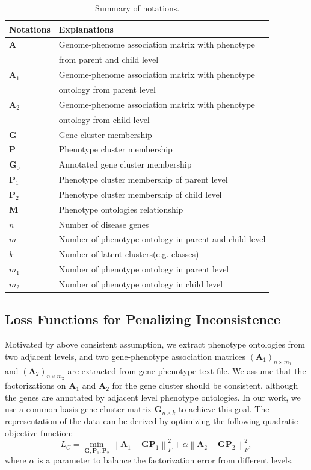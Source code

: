 \documentclass{bmcart}
\begin{document}
\begin{table}[t!]
 \caption{Summary of notations.}\label{Tab:Notations}
\begin{tabular}{|l|l|}
    \hline
    Notations & Explanations\\
    \hline\hline
    $\bm{A}$ & Genome-phenome association matrix with phenotype \\
    & from parent and child level\\
    $\bm{A}_1$ & Genome-phenome association matrix with phenotype\\
    & ontology from parent level\\
    $\bm{A}_2$ & Genome-phenome association matrix with phenotype\\
    & ontology from child level\\
    $\bm{G}$ & Gene cluster membership\\
    $\bm{P}$ & Phenotype cluster membership\\
    $\bm{G}_0$ & Annotated gene cluster membership\\
    $\bm{P}_1$ & Phenotype cluster membership of parent level\\
    $\bm{P}_2$ & Phenotype cluster membership of child level\\
    $\bm{M}$ & Phenotype ontologies relationship\\
    $n$ & Number of disease genes\\
    $m$ & Number of phenotype ontology in parent and child level\\
    $k$ & Number of latent clusters(e.g. classes)\\
    $m_1$ & Number of phenotype ontology in parent level\\
    $m_2$ & Number of phenotype ontology in child level\\
    \hline
  \end{tabular}
\end{table}

\subsection*{\textbf{Loss Functions for Penalizing Inconsistence}}
Motivated by above consistent assumption, we extract phenotype ontologies from two adjacent levels, and two gene-phenotype association matrices $(\bm{A}_1)_{n\times m_1}$ and $(\bm{A}_{2})_{n\times m_2}$ are extracted from gene-phenotype text file. We assume that the factorizations on  $\bm{A}_{1}$ and $\bm{A}_{2}$ for the gene cluster should be consistent, although the genes are annotated by adjacent level phenotype ontologies. In our work, we use a common basis gene cluster matrix $\bm{G}_{n\times k}$ to achieve this goal. The representation of the data can be derived by optimizing the following quadratic objective function:
\begin{equation}
{L_C} = \mathop {\min }\limits_{\bm{G},{\bm{P}_1},{\bm{P}_2}} \left\| \bm{A}_1 - \bm{G{P}}_1 \right\|_F^2 + \alpha \left\| {\bm{A}_2} - \bm{GP}_2 \right\|_F^2,
\end{equation}
where $\alpha$ is a parameter to balance the factorization error from different levels.
\end{document}

